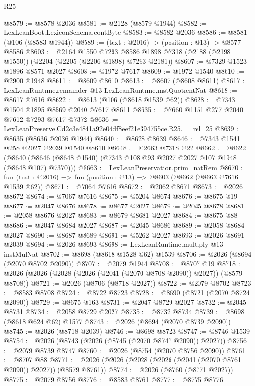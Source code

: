 \begin{lexlean}{R25}
\begin{coremodule}
@8579 := @8578 @2036
@8581 := @2128 (@8579 @1944)
@8582 := LexLeanBoot.LexiconSchema.contByte
@8583 := @8582 @2036
@8586 := @8581 (@106 (@8583 @1944))
@8589 := (text : @2016) -> (position : @13) -> @8577 @8586
@8603 := @2164
    @1550
    @7293
    @8586
    @1898
    @7318
    (@2188 (@2198 @1550))
    (@2204 (@2205 (@2206 @1898) @7293 @2181))
@8607 := @7329 @1523 @1896 @8571 @2027
@8608 := @1972 @7617
@8609 := @1972 @1540
@8610 := @2900 @1948
@8611 := @8609 @8610
@8613 := @8607 (@8608 @8611)
@8617 := LexLeanRuntime.remainder @13 LexLeanRuntime.instQuotientNat
@8618 := @8617 @7616
@8622 := @8613 (@106 (@8618 @1539 @62))
@8628 := @7343 @1504 @1895 @8569 @2040 @7617 @8611
@8635 := @7660 @1151 @277 @2040 @7612 @7293 @7617 @7372
@8636 := LexLeanPreserve.Cd2c3e4841a92e04df8eef21e394755ce.R25.__rel_25
@8639 := @8635 (@8636 @2036 @1944)
@8640 := @8628 @8639
@8646 := @7343 @1541 @258 @2027 @2039 @1540 @8610
@8648 := @2663 @7318 @22
@8662 := @8622
    (@8640 (@8646 (@8648 @1540) (@7343 @108 @93 @2027 @2027 @107 @1948 (@8648 @107) @7370)))
@8663 := LexLeanPreservation.prim_natRem
@8670 := fun (text : @2016) => fun (position : @13) => @8603 (@8662 (@8663 @7616 @1539 @62))
@8671 := @7064 @7616
@8672 := @2062 @8671
@8673 := @2026 @8672
@8674 := @7067 @7616
@8675 := @5204 @8674
@8676 := @8675 @19
@8677 := @2047 @8676
@8678 := @8677 @2027
@8679 := @2045 @8678
@8681 := @2058 @8676 @2027
@8683 := @8679 @8681 @2027
@8684 := @8675 @88
@8686 := @2047 @8684 @2027
@8687 := @2045 @8686
@8689 := @2058 @8684 @2027
@8690 := @8687 @8689
@8691 := @5262 @2027
@8693 := @2026 @8691 @2039
@8694 := @2026 @8693
@8698 := LexLeanRuntime.multiply @13 instMulNat
@8702 := @8698 (@8618 @1528 @62) @1539
@8706 := @2026 (@8694 (@2070 @8702 @2090))
@8707 := @2079 @1944
@8708 := @8707 @19
@8718 := @2026 (@2026 (@2028 (@2026 (@2041 (@2070 @8708 @2090)) @2027)) (@8579 @8708))
@8721 := @2026 (@8706 (@8718 @2027))
@8722 := @2079 @8702
@8723 := @8583 @8708
@8724 := @8722 @8723
@8728 := @8690 (@8721 (@2070 @8724 @2090))
@8729 := @8675 @163
@8731 := @2047 @8729 @2027
@8732 := @2045 @8731
@8734 := @2058 @8729 @2027
@8735 := @8732 @8734
@8739 := @8698 (@8618 @624 @62) @1577
@8743 := @2026 (@8694 (@2070 @8739 @2090))
@8745 := @2026 (@8718 @2039)
@8746 := @8698 @8723
@8747 := @8746 @1539
@8754 := @2026 (@8743 (@2026 (@8745 (@2070 @8747 @2090)) @2027))
@8756 := @2079 @8739 @8747
@8760 := @2026 (@8754 (@2070 @8756 @2090))
@8761 := @8707 @88
@8771 := @2026 (@2026 (@2028 (@2026 (@2041 (@2070 @8761 @2090)) @2027)) (@8579 @8761))
@8774 := @2026 (@8760 (@8771 @2027))
@8775 := @2079 @8756
@8776 := @8583 @8761
@8777 := @8775 @8776

\end{coremodule}
\end{lexlean}
